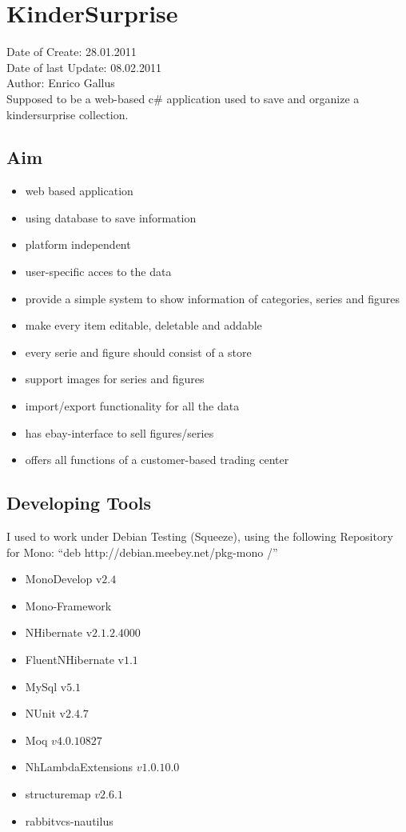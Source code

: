 \documentclass{article}
\begin{document}
\tableofcontents

\newpage

\section*{KinderSurprise}

Date of Create: 28.01.2011\\
Date of last Update: 08.02.2011\\
Author: Enrico Gallus\\

Supposed to be a web-based c\# application used to save and organize a
kindersurprise collection. 
\subsection{Aim}
\begin{itemize}
  \item web based application
  \item using database to save information
  \item platform independent
  \item user-specific acces to the data
  \item provide a simple system to show information of categories, series and
  figures
  \item make every item editable, deletable and addable
  \item every serie and figure should consist of a store
  \item support images for series and figures
  \item import/export functionality for all the data
  \item has ebay-interface to sell figures/series
  \item offers all functions of a customer-based trading center
\end{itemize}

\subsection{Developing Tools}
I used to work under Debian Testing (Squeeze), using the following Repository
for Mono: ``deb http://debian.meebey.net/pkg-mono /''

\begin{itemize}
  \item MonoDevelop v$2.4$
  \item Mono-Framework
  \item NHibernate v$2.1.2.4000$
  \item FluentNHibernate v$1.1$
  \item MySql v$5.1$
  \item NUnit v$2.4.7$
  \item Moq $v4.0.10827$
  \item NhLambdaExtensions $v1.0.10.0$
  \item structuremap $v2.6.1$
  \item rabbitvcs-nautilus
\end{itemize}
\end{document}
